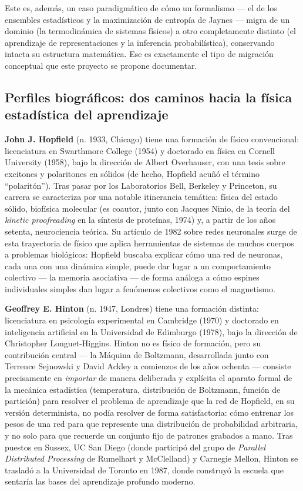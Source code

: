 \documentclass[12pt]{article}
\begin{document}
Este es, además, un caso paradigmático de cómo un formalismo --- el de los ensembles estadísticos y la maximización de entropía de Jaynes --- migra de un dominio (la termodinámica de sistemas físicos) a otro completamente distinto (el aprendizaje de representaciones y la inferencia probabilística), conservando intacta su estructura matemática. Ese es exactamente el tipo de migración conceptual que este proyecto se propone documentar.

\subsection{Perfiles biográficos: dos caminos hacia la física estadística del aprendizaje}

\textbf{John J. Hopfield} (n. 1933, Chicago) tiene una formación de físico convencional: licenciatura en Swarthmore College (1954) y doctorado en física en Cornell University (1958), bajo la dirección de Albert Overhauser, con una tesis sobre excitones y polaritones en sólidos (de hecho, Hopfield acuñó el término ``polaritón''). Tras pasar por los Laboratorios Bell, Berkeley y Princeton, su carrera se caracteriza por una notable itinerancia temática: física del estado sólido, biofísica molecular (es coautor, junto con Jacques Ninio, de la teoría del \emph{kinetic proofreading} en la síntesis de proteínas, 1974) y, a partir de los años setenta, neurociencia teórica. Su artículo de 1982 sobre redes neuronales surge de esta trayectoria de físico que aplica herramientas de sistemas de muchos cuerpos a problemas biológicos: Hopfield buscaba explicar cómo una red de neuronas, cada una con una dinámica simple, puede dar lugar a un comportamiento colectivo --- la memoria asociativa --- de forma análoga a cómo espines individuales simples dan lugar a fenómenos colectivos como el magnetismo.

\textbf{Geoffrey E. Hinton} (n. 1947, Londres) tiene una formación distinta: licenciatura en psicología experimental en Cambridge (1970) y doctorado en inteligencia artificial en la Universidad de Edimburgo (1978), bajo la dirección de Christopher Longuet-Higgins. Hinton no es físico de formación, pero su contribución central --- la Máquina de Boltzmann, desarrollada junto con Terrence Sejnowski y David Ackley a comienzos de los años ochenta --- consiste precisamente en \emph{importar} de manera deliberada y explícita el aparato formal de la mecánica estadística (temperatura, distribución de Boltzmann, función de partición) para resolver el problema de aprendizaje que la red de Hopfield, en su versión determinista, no podía resolver de forma satisfactoria: cómo entrenar los pesos de una red para que represente una distribución de probabilidad arbitraria, y no solo para que recuerde un conjunto fijo de patrones grabados a mano. Tras puestos en Sussex, UC San Diego (donde participó del grupo de \emph{Parallel Distributed Processing} de Rumelhart y McClelland) y Carnegie Mellon, Hinton se trasladó a la Universidad de Toronto en 1987, donde construyó la escuela que sentaría las bases del aprendizaje profundo moderno.
\end{document}
